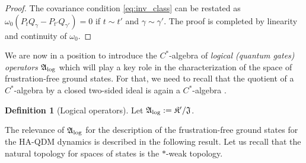 \documentclass[a4paper,12pt,twoside,reqno]{amsart}
\theoremstyle{plain}
\theoremstyle{definition}
\newtheorem{definition}[teo]{Definition}
\theoremstyle{remark}
\numberwithin{equation}{section}
\numberwithin{figure}{section}
\numberwithin{table}{section}
\begin{document}
	
	
	
	\begin{proof}
		The covariance condition \eqref{eq:inv_class} can be restated as
		$\omega_{0}(P_tQ_\gamma-P_{t'}Q_{\gamma'})=0$
		if $t\sim t'$ and $\gamma\sim\gamma'$. The proof is completed by linearity and continuity of $\omega_0$.
	\end{proof}
	
	
	
	\medskip
	
	
	
	
	
	We are now in a position to introduce the $C^*$-algebra of \emph{logical (quantum gates) operators} $\mathfrak{A}_{\rm log}$ which will play a key role in the characterization of the space of frustration-free ground states. For that, we need to recall that the quotient of a $C^*$-algebra by a closed two-sided ideal is again a   $C^*$-algebra \cite[Theorem 3.1.4]{Murphy}. 
	\begin{definition}[Logical operators]
		Let  $\mathfrak{A}_{\rm log}:=\mathfrak{K}'/\mathfrak{J}$.
	\end{definition}
	
	
	
	\medskip
	
	
	
	
	The relevance of $\mathfrak{A}_{\rm log}$ for the description of the frustration-free ground states for the {HA-QDM dynamics} is described in the following result. Let us recall that the natural topology for spaces of states is the $\ast$-weak topology.
	
	
	
	
	
\end{document}
